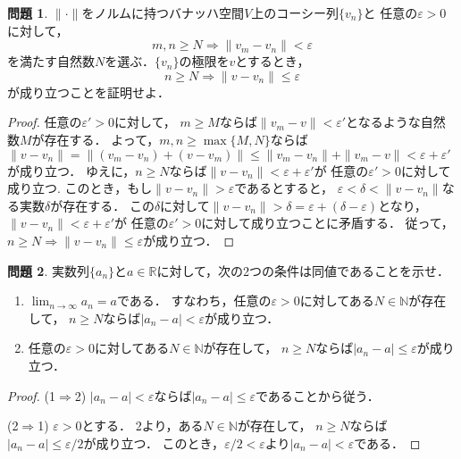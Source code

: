 \documentclass{jsarticle}
\theoremstyle{definition}
\newtheorem{qst}{問題}
\begin{document}
\begin{qst}
$\|\cdot\|$をノルムに持つバナッハ空間$V$上のコーシー列$\{v_n\}$と
任意の$\varepsilon>0$に対して，
\[ m,n\geq N\Rightarrow\|v_m-v_n\|<\varepsilon \]
を満たす自然数$N$を選ぶ．$\{v_n\}$の極限を$v$とするとき，
\[ n\geq N\Rightarrow\|v-v_n\|\leq\varepsilon \]
が成り立つことを証明せよ．
\end{qst}
\begin{proof}
任意の$\varepsilon'>0$に対して，
$m\geq M$ならば$\|v_m-v\|<\varepsilon'$となるような自然数$M$が存在する．
よって，$m,n\geq\max\{M,N\}$ならば
$\|v-v_n\|=\|(v_m-v_n)+(v-v_m)\|\leq\|v_m-v_n\|+\|v_m-v\|<\varepsilon+\varepsilon'$
が成り立つ．
ゆえに，$n\geq N$ならば$\|v-v_n\|<\varepsilon+\varepsilon'$が
任意の$\varepsilon'>0$に対して成り立つ.
このとき，もし$\|v-v_n\|>\varepsilon$であるとすると，
$\varepsilon<\delta<\|v-v_n\|$なる実数$\delta$が存在する．
この$\delta$に対して$\|v-v_n\|>\delta=\varepsilon+(\delta-\varepsilon)$となり，
$\|v-v_n\|<\varepsilon+\varepsilon'$が
任意の$\varepsilon'>0$に対して成り立つことに矛盾する．
従って，$n\geq N\Rightarrow\|v-v_n\|\leq\varepsilon$が成り立つ．
\end{proof}

\begin{qst}
実数列$\{a_n\}$と$a\in\mathbb{R}$に対して，次の2つの条件は同値であることを示せ．
\begin{enumerate}
\item$\displaystyle\lim_{n\to\infty}a_n=a$である．
すなわち，任意の$\varepsilon>0$に対してある$N\in\mathbb{N}$が存在して，
$n\geq N$ならば$|a_n-a|<\varepsilon$が成り立つ．
\item 任意の$\varepsilon>0$に対してある$N\in\mathbb{N}$が存在して，
$n\geq N$ならば$|a_n-a|\leq\varepsilon$が成り立つ．
\end{enumerate}
\end{qst}
\begin{proof}
(1$\Rightarrow$2)
$|a_n-a|<\varepsilon$ならば$|a_n-a|\leq\varepsilon$であることから従う．

(2$\Rightarrow$1)
$\varepsilon>0$とする．
2より，ある$N\in\mathbb{N}$が存在して，
$n\geq N$ならば$|a_n-a|\leq\varepsilon/2$が成り立つ．
このとき，$\varepsilon/2<\varepsilon$より$|a_n-a|<\varepsilon$である．
\end{proof}
\end{document}
